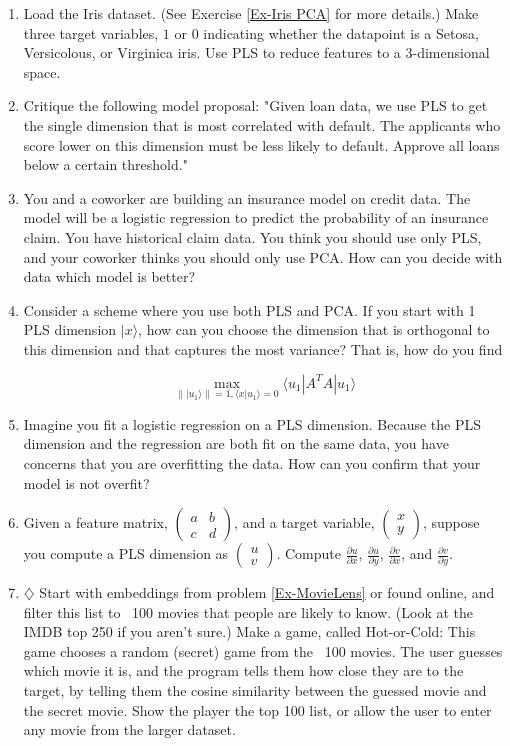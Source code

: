 \documentclass{amsbook}
\begin{document}
\begin{enumerate}
\item \label{Ex-Iris PLS} Load the Iris dataset.  (See Exercise \ref{Ex-Iris PCA} for more details.)  Make three target variables, $1$ or $0$ indicating whether the datapoint is a Setosa, Versicolous, or Virginica iris.  Use PLS to reduce features to a $3$-dimensional space.
\item Critique the following model proposal:  "Given loan data, we use PLS to get the single dimension that is most correlated with default.  The applicants who score lower on this dimension must be less likely to default.  Approve all loans below a certain threshold."
\item You and a coworker are building an insurance model on credit data.  The model will be a logistic regression to predict the probability of an insurance claim.  You have historical claim data.  You think you should use only PLS, and your coworker thinks you should only use PCA.  How can you decide with data which model is better?
\item \label{Ex-PLS PCA hybrid} Consider a scheme where you use both PLS and PCA.  If you start with 1 PLS dimension $|x\rangle$, how can you choose the dimension that is orthogonal to this dimension and that captures the most variance?  That is, how do you find

$$
\max_{\left\||u_1\rangle\right\|=1, \langle x|u_1\rangle=0}\langle u_1|A^TA|u_1\rangle
$$
\item Imagine you fit a logistic regression on a PLS dimension.  Because the PLS dimension and the regression are both fit on the same data, you have concerns that you are overfitting the data.  How can you confirm that your model is not overfit?
\item Given a feature matrix, $\left(\begin{array}{cc}a&b\\c&d\end{array}\right)$, and a target variable, $\left(\begin{array}{c}x\\y\end{array}\right)$, suppose you compute a PLS dimension as $\left(\begin{array}{c}u\\v\end{array}\right)$.  Compute $\frac{\partial u}{\partial x}$, $\frac{\partial u}{\partial y}$, $\frac{\partial v}{\partial x}$, and $\frac{\partial v}{\partial y}$.
\item $\diamondsuit$ Start with embeddings from problem \ref{Ex-MovieLens} or found online, and filter this list to ~100 movies that people are likely to know.  (Look at the IMDB top 250 if you aren’t sure.)  Make a game, called Hot-or-Cold:  This game chooses a random (secret) game from the ~100 movies.  The user guesses which movie it is, and the program tells them how close they are to the target, by telling them the cosine similarity between the guessed movie and the secret movie.  Show the player the top 100 list, or allow the user to enter any movie from the larger dataset.
\end{enumerate}
\end{document}
